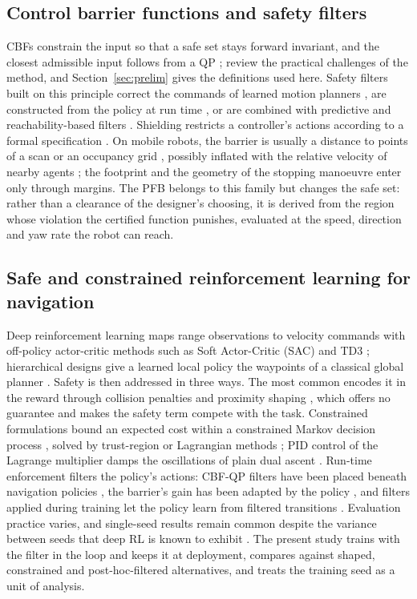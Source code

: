\documentclass[11pt]{article}
\theoremstyle{definition}
\begin{document}
\subsection{Control barrier functions and safety filters}
CBFs constrain the input so that a safe set stays forward invariant, and the closest admissible input follows from a QP
\citep{ames2017cbfqp,ames2019cbf}; \citet{garg2024advances} review the practical challenges of the method, and
Section~\ref{sec:prelim} gives the definitions used here. Safety filters built on this principle correct the commands of learned
motion planners \citep{wang2022ensuring}, are constructed from the policy at run time
\citep{knoedler2025onthefly}, or are combined with predictive and reachability-based filters
\citep{wabersich2023safety}. Shielding restricts a controller's actions according to a formal
specification \citep{alshiekh2018shielding}. On mobile robots, the barrier is usually a distance to
points of a scan or an occupancy grid \citep{raja2024ogmcbf}, possibly inflated with the relative
velocity of nearby agents \citep{zeng2025relvel}; the footprint and the geometry of the stopping manoeuvre
enter only through margins. The PFB belongs to this family but changes the safe set: rather than a
clearance of the designer's choosing, it is derived from the region whose violation the certified function punishes,
evaluated at the speed, direction and yaw rate the robot can reach.

\subsection{Safe and constrained reinforcement learning for navigation}
Deep reinforcement learning maps range observations to velocity commands with off-policy actor-critic
methods such as Soft Actor-Critic (SAC) \citep{haarnoja2018sac} and TD3 \citep{fujimoto2018td3};
hierarchical designs give a learned local policy the waypoints of a classical global planner
\citep{zhu2023hierarchical,kolomeytsev2025hybrid}. Safety is then addressed in three ways. The most common
encodes it in the reward through collision penalties and proximity shaping
\citep{taheri2024ppo,cai2025agv,li2024warehouse}, which offers no guarantee and makes the safety term
compete with the task. Constrained formulations bound an expected cost within a constrained Markov
decision process \citep{altman1999cmdp}, solved by trust-region \citep{achiam2017cpo} or Lagrangian
methods \citep{ray2019benchmarking}; PID control of the Lagrange multiplier damps the oscillations of
plain dual ascent \citep{stooke2020pid}. Run-time enforcement filters the policy's actions: CBF-QP
filters have been placed beneath navigation policies \citep{guo2025radar}, the barrier's gain has been
adapted by the policy \citep{mohammad2025sacadapt}, and filters applied during training let the policy
learn from filtered transitions \citep{cheng2019endtoend,yang2025cbfrl}. Evaluation practice varies, and single-seed results remain common despite the variance between seeds that deep RL is known
to exhibit \citep{henderson2018matters,agarwal2021precipice}. The present study trains with the filter in
the loop and keeps it at deployment, compares against shaped, constrained and post-hoc-filtered
alternatives, and treats the training seed as a unit of analysis.
\end{document}

